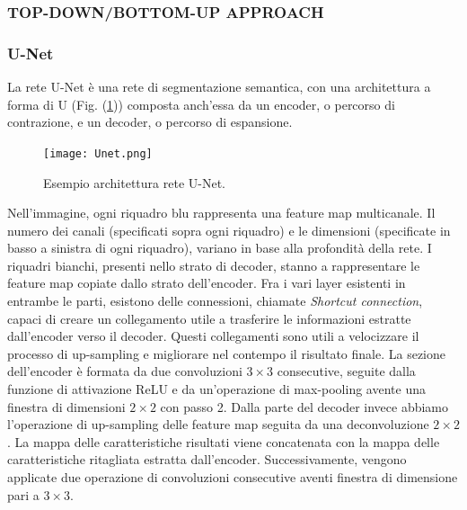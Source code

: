 \subsubsection{TOP-DOWN/BOTTOM-UP APPROACH}
\subsubsection{U-Net}
La rete U-Net \cite{unet} è una rete di segmentazione semantica, con una architettura a forma 
di U (Fig. (\ref{unet})) composta anch'essa da un encoder, o percorso di contrazione, e 
un decoder, o percorso di espansione.
\begin{figure}
    \centering
    \texttt{[image: Unet.png]}
    \centering
    \caption{Esempio architettura rete U-Net.}
    \label{unet}
\end{figure}
Nell'immagine, ogni riquadro blu rappresenta una feature map multicanale. Il 
numero dei canali (specificati sopra ogni riquadro) e le dimensioni (specificate in 
basso a sinistra di ogni riquadro), variano in base alla profondità della rete. I 
riquadri bianchi, presenti nello strato di decoder, stanno a rappresentare le feature 
map copiate dallo strato dell'encoder. Fra i vari layer esistenti in entrambe le 
parti, esistono delle connessioni, chiamate \emph{Shortcut connection}, capaci di creare 
un collegamento utile a trasferire le informazioni estratte dall'encoder verso il 
decoder. Questi collegamenti sono utili a velocizzare il processo di up-sampling e 
migliorare nel contempo il risultato finale. La sezione dell'encoder è formata da 
due convoluzioni $3 \times 3$ consecutive, seguite dalla funzione di attivazione ReLU e 
da un'operazione di max-pooling avente una finestra di dimensioni $2 \times 2$ con 
passo 2. Dalla parte del decoder invece abbiamo l'operazione di up-sampling delle 
feature map seguita da una deconvoluzione $2 \times 2$. La mappa delle caratteristiche 
risultati viene concatenata con la mappa delle caratteristiche ritagliata estratta 
dall'encoder. Successivamente, vengono applicate due operazione di convoluzioni 
consecutive aventi finestra di dimensione pari a $3 \times 3$.

